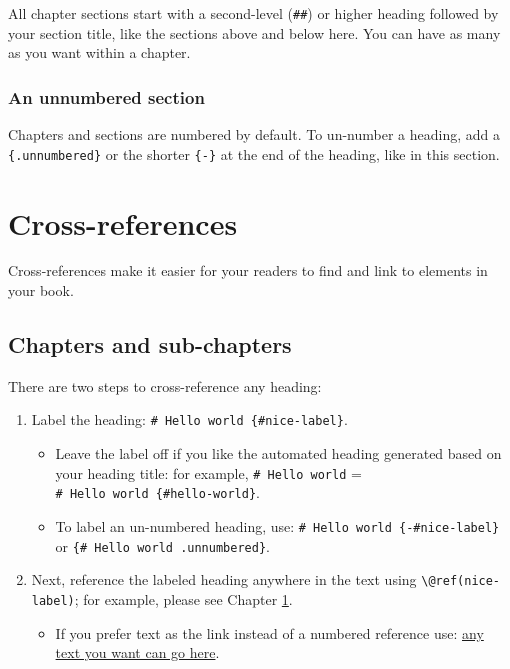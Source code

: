 \documentclass[
]{book}
\providecommand{\tightlist}{%
  \setlength{\itemsep}{0pt}\setlength{\parskip}{0pt}}
\theoremstyle{definition}
\theoremstyle{definition}
\theoremstyle{definition}
\theoremstyle{definition}
\theoremstyle{remark}
\begin{document}
All chapter sections start with a second-level (\texttt{\#\#}) or higher heading followed by your section title, like the sections above and below here. You can have as many as you want within a chapter.

\hypertarget{an-unnumbered-section}{%
\subsection*{An unnumbered section}\label{an-unnumbered-section}}

Chapters and sections are numbered by default. To un-number a heading, add a \texttt{\{.unnumbered\}} or the shorter \texttt{\{-\}} at the end of the heading, like in this section.

\hypertarget{cross}{%
\chapter{Cross-references}\label{cross}}

Cross-references make it easier for your readers to find and link to elements in your book.

\hypertarget{chapters-and-sub-chapters}{%
\section{Chapters and sub-chapters}\label{chapters-and-sub-chapters}}

There are two steps to cross-reference any heading:

\begin{enumerate}
\def\labelenumi{\arabic{enumi}.}
\tightlist
\item
  Label the heading: \texttt{\#\ Hello\ world\ \{\#nice-label\}}.

  \begin{itemize}
  \tightlist
  \item
    Leave the label off if you like the automated heading generated based on your heading title: for example, \texttt{\#\ Hello\ world} = \texttt{\#\ Hello\ world\ \{\#hello-world\}}.
  \item
    To label an un-numbered heading, use: \texttt{\#\ Hello\ world\ \{-\#nice-label\}} or \texttt{\{\#\ Hello\ world\ .unnumbered\}}.
  \end{itemize}
\item
  Next, reference the labeled heading anywhere in the text using \texttt{\textbackslash{}@ref(nice-label)}; for example, please see Chapter \ref{cross}.

  \begin{itemize}
  \tightlist
  \item
    If you prefer text as the link instead of a numbered reference use: \protect\hyperlink{cross}{any text you want can go here}.
  \end{itemize}
\end{enumerate}
\end{document}
